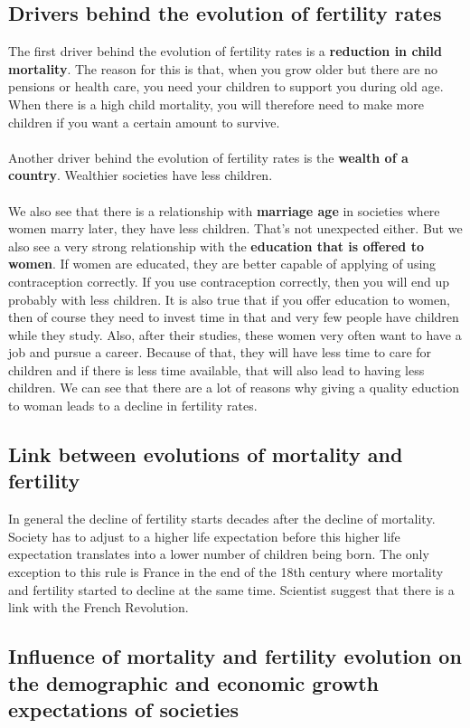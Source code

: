 \documentclass[../summary.tex]{subfiles}
\begin{document}
	\subsection{Drivers behind the evolution of fertility rates}
	The first driver behind the evolution of fertility rates is a \textbf{reduction in child mortality}. The reason for this is that, when you grow older but there are no pensions or health care, you need your children to support you during old age. When there is a high child mortality, you will therefore need to make more children if you want a certain amount to survive.  
	\\
	\\
	Another driver behind the evolution of fertility rates is the \textbf{wealth of a country}. Wealthier societies have less children. 
	\\
	\\
	We also see that there is a relationship with \textbf{marriage age} in societies where women marry later, they have less children. That's not unexpected either. But we also see a very strong relationship with the \textbf{education that is offered to women}. If women are educated, they are better capable of applying of using contraception correctly. If you use contraception correctly, then you will end up probably with less children. It is also true that if you offer education to women, then of course they need to invest time in that and very few people have children while they study. Also, after their studies, these women very often want to have a job and pursue a career. Because of that, they will have less time to care for children and if there is less time available, that will also lead to having less children. We can see that there are a lot of reasons why giving a quality eduction to woman leads to a decline in fertility rates.
	
	\subsection{Link between evolutions of mortality and fertility}
	In general the decline of fertility starts decades after the decline of mortality. Society has to adjust to a higher life expectation before this higher life expectation translates into a lower number of children being born. The only exception to this rule is France in the end of the 18th century where mortality and fertility started to decline at the same time. Scientist suggest that there is a link with the French Revolution. 
	
	\subsection{Influence of mortality and fertility evolution on the demographic and economic growth expectations of societies}
	
\end{document}
